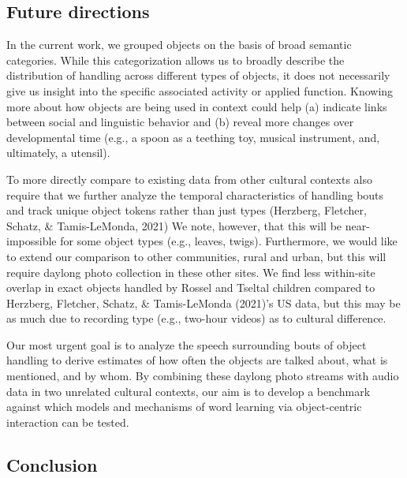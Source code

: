 \documentclass[10pt, letterpaper]{article}
\begin{document}
\hypertarget{future-directions}{%
\subsection{Future directions}\label{future-directions}}

In the current work, we grouped objects on the basis of broad semantic
categories. While this categorization allows us to broadly describe the
distribution of handling across different types of objects, it does not
necessarily give us insight into the specific associated activity or
applied function. Knowing more about how objects are being used in
context could help (a) indicate links between social and linguistic
behavior and (b) reveal more changes over developmental time (e.g., a
spoon as a teething toy, musical instrument, and, ultimately, a
utensil).

To more directly compare to existing data from other cultural contexts
also require that we further analyze the temporal characteristics of
handling bouts and track unique object tokens rather than just types
(Herzberg, Fletcher, Schatz, \& Tamis-LeMonda, 2021) We note, however,
that this will be near-impossible for some object types (e.g., leaves,
twigs). Furthermore, we would like to extend our comparison to other
communities, rural and urban, but this will require daylong photo
collection in these other sites. We find less within-site overlap in
exact objects handled by Rossel and Tseltal children compared to
Herzberg, Fletcher, Schatz, \& Tamis-LeMonda (2021)'s US data, but this
may be as much due to recording type (e.g., two-hour videos) as to
cultural difference.

Our most urgent goal is to analyze the speech surrounding bouts of
object handling to derive estimates of how often the objects are talked
about, what is mentioned, and by whom. By combining these daylong photo
streams with audio data in two unrelated cultural contexts, our aim is
to develop a benchmark against which models and mechanisms of word
learning via object-centric interaction can be tested.

\hypertarget{conclusion}{%
\subsection{Conclusion}\label{conclusion}}
\end{document}
